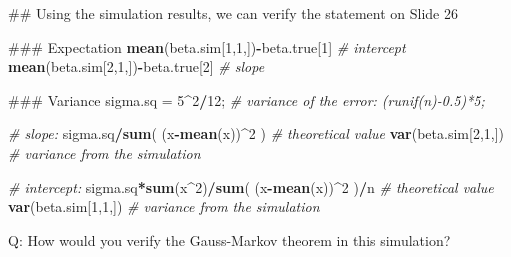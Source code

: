 \documentclass[12pt,]{book}
\newenvironment{Shaded}{\begin{snugshade}}{\end{snugshade}}
\newcommand{\KeywordTok}[1]{\textcolor[rgb]{0.13,0.29,0.53}{\textbf{#1}}}
\newcommand{\DecValTok}[1]{\textcolor[rgb]{0.00,0.00,0.81}{#1}}
\newcommand{\StringTok}[1]{\textcolor[rgb]{0.31,0.60,0.02}{#1}}
\newcommand{\CommentTok}[1]{\textcolor[rgb]{0.56,0.35,0.01}{\textit{#1}}}
\newcommand{\OperatorTok}[1]{\textcolor[rgb]{0.81,0.36,0.00}{\textbf{#1}}}
\newcommand{\NormalTok}[1]{#1}
\begin{document}
\begin{Shaded}
\begin{Highlighting}[]
\NormalTok{## Using the simulation results, we can verify the statement on Slide 26}

\NormalTok{### Expectation }
\KeywordTok{mean}\NormalTok{(beta.sim[}\DecValTok{1}\NormalTok{,}\DecValTok{1}\NormalTok{,])}\OperatorTok{-}\NormalTok{beta.true[}\DecValTok{1}\NormalTok{] }\CommentTok{# intercept }
\KeywordTok{mean}\NormalTok{(beta.sim[}\DecValTok{2}\NormalTok{,}\DecValTok{1}\NormalTok{,])}\OperatorTok{-}\NormalTok{beta.true[}\DecValTok{2}\NormalTok{] }\CommentTok{# slope }

\NormalTok{### Variance }
\NormalTok{sigma.sq =}\StringTok{ }\DecValTok{5}\OperatorTok{^}\DecValTok{2}\OperatorTok{/}\DecValTok{12}\NormalTok{; }\CommentTok{# variance of the error: (runif(n)-0.5)*5;}

\CommentTok{# slope:}
\NormalTok{sigma.sq}\OperatorTok{/}\KeywordTok{sum}\NormalTok{(  (x}\OperatorTok{-}\KeywordTok{mean}\NormalTok{(x))}\OperatorTok{^}\DecValTok{2}\NormalTok{  ) }\CommentTok{# theoretical value }
\KeywordTok{var}\NormalTok{(beta.sim[}\DecValTok{2}\NormalTok{,}\DecValTok{1}\NormalTok{,]) }\CommentTok{# variance from the simulation }


\CommentTok{# intercept:}
\NormalTok{sigma.sq}\OperatorTok{*}\KeywordTok{sum}\NormalTok{(x}\OperatorTok{^}\DecValTok{2}\NormalTok{)}\OperatorTok{/}\KeywordTok{sum}\NormalTok{(  (x}\OperatorTok{-}\KeywordTok{mean}\NormalTok{(x))}\OperatorTok{^}\DecValTok{2}\NormalTok{  )}\OperatorTok{/}\NormalTok{n }\CommentTok{# theoretical value }
\KeywordTok{var}\NormalTok{(beta.sim[}\DecValTok{1}\NormalTok{,}\DecValTok{1}\NormalTok{,]) }\CommentTok{# variance from the simulation }
\end{Highlighting}
\end{Shaded}

Q: How would you verify the Gauss-Markov theorem in this simulation?
\end{document}
